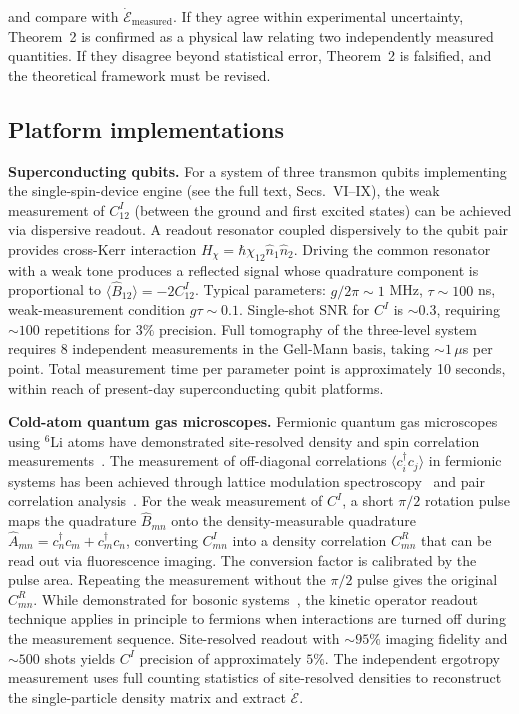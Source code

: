 \documentclass[aps,pra,preprint,groupedaddress,amsmath,amssymb,floatfix]{revtex4-2}
\begin{document}
and compare with $\dot{\mathcal{E}}_{\text{measured}}$. If they agree within experimental uncertainty, Theorem~2 is confirmed as a physical law relating two independently measured quantities. If they disagree beyond statistical error, Theorem~2 is falsified, and the theoretical framework must be revised.

\subsection{Platform implementations}
\label{sec:platforms}

\textbf{Superconducting qubits.}
For a system of three transmon qubits implementing the single-spin-device engine (see the full text, Secs.~VI--IX), the weak measurement of $C^I_{12}$ (between the ground and first excited states) can be achieved via dispersive readout. A readout resonator coupled dispersively to the qubit pair provides cross-Kerr interaction $H_{\chi} = \hbar\chi_{12} \hat{n}_1 \hat{n}_2$. Driving the common resonator with a weak tone produces a reflected signal whose quadrature component is proportional to $\langle \hat{B}_{12} \rangle = -2 C^I_{12}$. Typical parameters: $g/2\pi \sim 1$ MHz, $\tau \sim 100$ ns, weak-measurement condition $g\tau \sim 0.1$. Single-shot SNR for $C^I$ is $\sim 0.3$, requiring $\sim 100$ repetitions for $3\%$ precision. Full tomography of the three-level system requires 8 independent measurements in the Gell-Mann basis, taking $\sim 1\,\mu$s per point. Total measurement time per parameter point is approximately 10 seconds, within reach of present-day superconducting qubit platforms.

\textbf{Cold-atom quantum gas microscopes.}
Fermionic quantum gas microscopes using $^6$Li atoms have demonstrated site-resolved density and spin correlation measurements~\cite{parsons2015,parsons2016,mazurenko2017}. The measurement of off-diagonal correlations $\langle c^\dagger_i c_j \rangle$ in fermionic systems has been achieved through lattice modulation spectroscopy~\cite{cocchi2017} and pair correlation analysis~\cite{yao2025}. For the weak measurement of $C^I$, a short $\pi/2$ rotation pulse maps the quadrature $\hat{B}_{mn}$ onto the density-measurable quadrature $\hat{A}_{mn} = c^\dagger_n c_m + c^\dagger_m c_n$, converting $C^I_{mn}$ into a density correlation $C^R_{mn}$ that can be read out via fluorescence imaging. The conversion factor is calibrated by the pulse area. Repeating the measurement without the $\pi/2$ pulse gives the original $C^R_{mn}$. While demonstrated for bosonic systems~\cite{karch2024}, the kinetic operator readout technique applies in principle to fermions when interactions are turned off during the measurement sequence. Site-resolved readout with $\sim 95\%$ imaging fidelity and $\sim 500$ shots yields $C^I$ precision of approximately $5\%$. The independent ergotropy measurement uses full counting statistics of site-resolved densities to reconstruct the single-particle density matrix and extract $\dot{\mathcal{E}}$.
\end{document}
